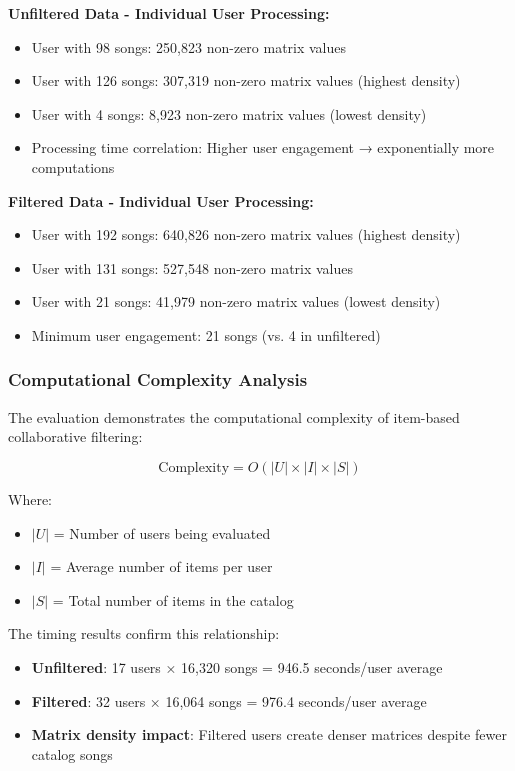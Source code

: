 \documentclass[12pt,a4paper]{article}
\begin{document}
\textbf{Unfiltered Data - Individual User Processing:}
\begin{itemize}
    \item User with 98 songs: 250,823 non-zero matrix values
    \item User with 126 songs: 307,319 non-zero matrix values (highest density)
    \item User with 4 songs: 8,923 non-zero matrix values (lowest density)
    \item Processing time correlation: Higher user engagement → exponentially more computations
\end{itemize}

\textbf{Filtered Data - Individual User Processing:}
\begin{itemize}
    \item User with 192 songs: 640,826 non-zero matrix values (highest density)
    \item User with 131 songs: 527,548 non-zero matrix values
    \item User with 21 songs: 41,979 non-zero matrix values (lowest density)
    \item Minimum user engagement: 21 songs (vs. 4 in unfiltered)
\end{itemize}

\subsubsection{Computational Complexity Analysis}

The evaluation demonstrates the computational complexity of item-based collaborative filtering:

\begin{equation}
\text{Complexity} = O(|U| \times |I| \times |S|)
\end{equation}

Where:
\begin{itemize}
    \item $|U|$ = Number of users being evaluated
    \item $|I|$ = Average number of items per user
    \item $|S|$ = Total number of items in the catalog
\end{itemize}

The timing results confirm this relationship:
\begin{itemize}
    \item \textbf{Unfiltered}: 17 users × 16,320 songs = 946.5 seconds/user average
    \item \textbf{Filtered}: 32 users × 16,064 songs = 976.4 seconds/user average
    \item \textbf{Matrix density impact}: Filtered users create denser matrices despite fewer catalog songs
\end{itemize}
\end{document}
